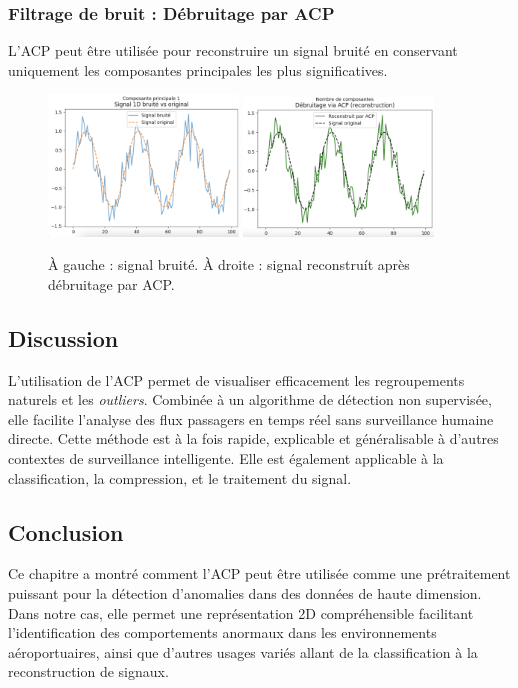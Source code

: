 \documentclass[a4paper,12pt]{report}
\begin{document}
\subsubsection{Filtrage de bruit : D\'ebruitage par ACP}
L'ACP peut \^etre utilis\'ee pour reconstruire un signal bruit\'e en conservant uniquement les composantes principales les plus significatives.

\begin{figure}[h!]
  \centering
  \includegraphics[width=0.45\textwidth]{signal_bruite.png}   
  \includegraphics[width=0.45\textwidth]{signal_debruite.png}   
  \caption{\`A gauche : signal bruit\'e. \`A droite : signal reconstru\'it apr\`es d\'ebruitage par ACP.}
  \label{fig:debruitage}
\end{figure}

\subsection{Discussion}
L'utilisation de l'ACP permet de visualiser efficacement les regroupements naturels et les \textit{outliers}. Combin\'ee \`a un algorithme de d\'etection non supervis\'ee, elle facilite l'analyse des flux passagers en temps r\'eel sans surveillance humaine directe. Cette m\'ethode est \`a la fois rapide, explicable et g\'en\'eralisable \`a d'autres contextes de surveillance intelligente. Elle est \'egalement applicable \`a la classification, la compression, et le traitement du signal.

\subsection{Conclusion}
Ce chapitre a montr\'e comment l'ACP peut \^etre utilis\'ee comme une pr\'etraitement puissant pour la d\'etection d'anomalies dans des donn\'ees de haute dimension. Dans notre cas, elle permet une repr\'esentation 2D compr\'ehensible facilitant l'identification des comportements anormaux dans les environnements a\'eroportuaires, ainsi que d'autres usages vari\'es allant de la classification \`a la reconstruction de signaux.
\end{document}
